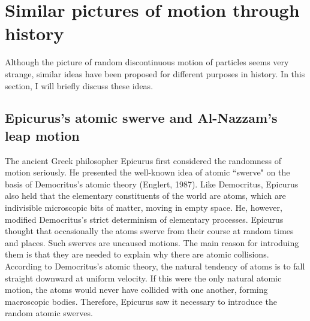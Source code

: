 



\section{Similar pictures of motion through history}


Although the picture of random discontinuous motion of particles seems very strange, similar ideas have been proposed for different purposes in history. In this section, I will briefly discuss these ideas.

\subsection{Epicurus's atomic swerve and Al-Nazzam's leap motion}

The ancient Greek philosopher Epicurus first considered the randomness of motion seriously. He presented the well-known idea of atomic ``swerve" on the basis of Democritus's atomic theory (Englert, 1987). Like Democritus, Epicurus also held that the elementary constituents of the world are atoms, which are indivisible microscopic bits of matter, moving in empty space. He, however, modified Democritus's strict determinism of elementary processes. Epicurus thought that occasionally the atoms swerve from their course at random times and places. Such swerves are uncaused motions. The main reason for introduing them is that they are needed to explain why there are atomic collisions. According to Democritus's atomic theory, the natural tendency of atoms is to fall straight downward at uniform velocity. If this were the only natural atomic motion, the atoms would never have collided with one another, forming macroscopic bodies. Therefore, Epicurus saw it necessary to introduce the random atomic swerves.

